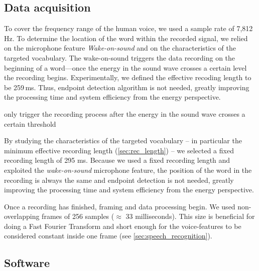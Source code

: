 \subsection{Data acquisition}
To cover the frequency range of the human voice, we used a sample rate of 7,812 Hz. To determine the location of the word within the recorded signal, we relied on the microphone feature  \textit{Wake-on-sound} and on the characteristics of the targeted vocabulary. The wake-on-sound triggers the data recording on the beginning of a word---once the energy in the sound wave crosses a certain level the recording begins. Experimentally, we defined the effective recoding length to be 259\,ms. Thus, endpoint detection algorithm is not needed, greatly improving the processing time and system efficiency from the energy perspective.

only trigger the recording process after the energy in the sound wave crosses a certain threshold

By studying the characteristics of the targeted vocabulary -- in particular the minimum effective recording length (\cref{sec:rec_length}) -- we selected a fixed recording length of 295 ms. Because we used a fixed recording length and exploited the \textit{wake-on-sound} microphone feature, the position of the word in the recording is always the same and endpoint detection is not needed, greatly improving the processing time and system efficiency from the energy perspective.

Once a recording has finished, framing and data processing begin. We used non-overlapping frames of 256 samples ($\approx$ 33 milliseconds). This size is beneficial for doing a Fast Fourier Transform and short enough for the voice-features to be considered constant inside one frame (see \cref{sec:speech_recognition}).


\subsection{Software}

